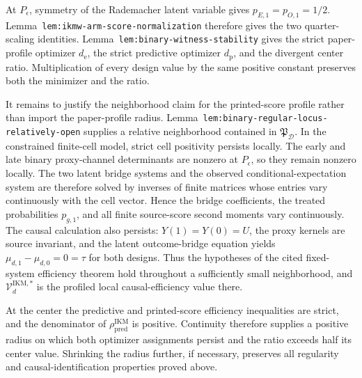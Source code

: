 At \(P_\epsilon\), symmetry of the Rademacher latent variable gives \(p_{E,1}=p_{O,1}=1/2\). Lemma~\texttt{lem:ikmw-arm-score-normalization} therefore gives the two quarter-scaling identities. Lemma~\texttt{lem:binary-witness-stability} gives the strict paper-profile optimizer \(d_{\mathrm e}\), the strict predictive optimizer \(d_{\mathrm p}\), and the divergent center ratio. Multiplication of every design value by the same positive constant preserves both the minimizer and the ratio.

It remains to justify the neighborhood claim for the printed-score profile rather than import the paper-profile radius. Lemma~\texttt{lem:binary-regular-locus-relatively-open} supplies a relative neighborhood contained in \(\mathfrak P_{\mathcal D}\). In the constrained finite-cell model, strict cell positivity persists locally. The early and late binary proxy-channel determinants are nonzero at \(P_\epsilon\), so they remain nonzero locally. The two latent bridge systems and the observed conditional-expectation system are therefore solved by inverses of finite matrices whose entries vary continuously with the cell vector. Hence the bridge coefficients, the treated probabilities \(p_{g,1}\), and all finite source-score second moments vary continuously. The causal calculation also persists: \(Y(1)=Y(0)=U\), the proxy kernels are source invariant, and the latent outcome-bridge equation yields \(\mu_{d,1}-\mu_{d,0}=0=\tau\) for both designs. Thus the hypotheses of the cited fixed-system efficiency theorem hold throughout a sufficiently small neighborhood, and \(\mathcal V_d^{\mathrm{IKM},*}\) is the profiled local causal-efficiency value there.

At the center the predictive and printed-score efficiency inequalities are strict, and the denominator of \(\rho_{\mathrm{pred}}^{\mathrm{IKM}}\) is positive. Continuity therefore supplies a positive radius on which both optimizer assignments persist and the ratio exceeds half its center value. Shrinking the radius further, if necessary, preserves all regularity and causal-identification properties proved above.